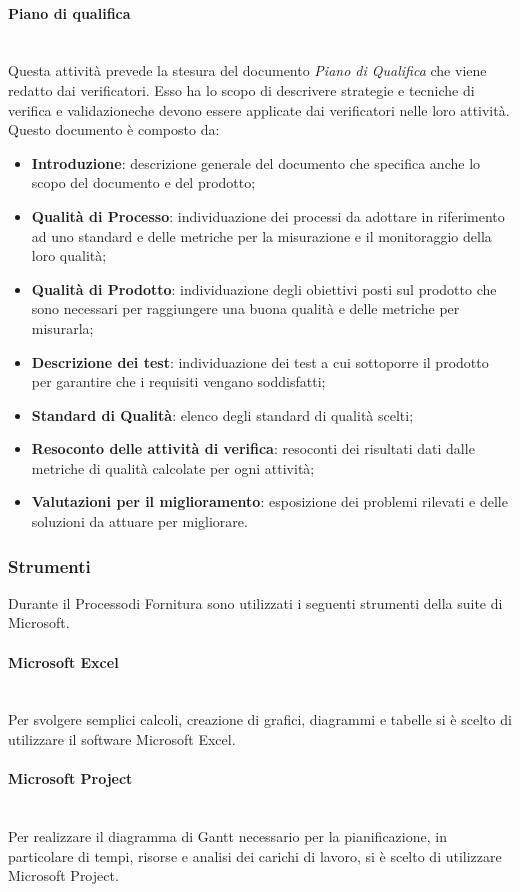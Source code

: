 \paragraph{Piano di qualifica}\mbox{}\\ [1mm]
Questa attività prevede la stesura del documento \textit{Piano di Qualifica} che viene redatto dai verificatori. Esso ha lo scopo di descrivere strategie e tecniche di verifica e validazione\glosp che devono essere applicate dai verificatori nelle loro attività.
Questo documento è composto da:
\begin{itemize}
	\item \textbf{Introduzione}: descrizione generale del documento che specifica anche lo scopo del documento e del prodotto;
	\item \textbf{Qualità di Processo}: individuazione dei processi da adottare in riferimento ad uno standard e delle metriche per la misurazione e il monitoraggio della loro qualità;
	\item \textbf{Qualità di Prodotto}: individuazione degli obiettivi posti sul prodotto che sono necessari per raggiungere una buona qualità e delle metriche per misurarla;
	\item \textbf{Descrizione dei test}: individuazione dei test a cui sottoporre il prodotto per garantire che i requisiti vengano soddisfatti;
	\item \textbf{Standard di Qualità}: elenco degli standard di qualità scelti;
	\item \textbf{Resoconto delle attività di verifica}: resoconti dei risultati dati dalle metriche di qualità calcolate per ogni attività;
	\item \textbf{Valutazioni per il miglioramento}: esposizione dei problemi rilevati e delle soluzioni da attuare per migliorare.
\end{itemize}
\subsubsection{Strumenti}
Durante il Processo\glosp di Fornitura sono utilizzati i seguenti strumenti della suite di Microsoft.
\paragraph{Microsoft Excel}\mbox{}\\ [1mm]
Per svolgere semplici calcoli, creazione di grafici, diagrammi e tabelle si è scelto di utilizzare il software Microsoft Excel.
\paragraph{Microsoft Project}\mbox{}\\ [1mm]
Per realizzare il diagramma di Gantt necessario per la pianificazione, in particolare di tempi, risorse e analisi dei carichi di lavoro, si è scelto di utilizzare Microsoft Project.

